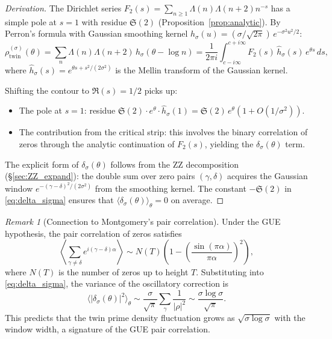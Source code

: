 \documentclass[11pt,a4paper]{article}
\theoremstyle{remark}
\newtheorem{remark}[theorem]{Remark}
\begin{document}
\begin{proof}[Derivation]
The Dirichlet series $F_2(s) = \sum_{n\ge 1}\Lambda(n)\Lambda(n+2)n^{-s}$ has a simple pole at $s=1$ with residue $\mathfrak{S}(2)$ (Proposition~\ref{prop:analytic}).
By Perron's formula with Gaussian smoothing kernel $h_\sigma(u) = (\sigma/\sqrt{2\pi})\,e^{-\sigma^2 u^2/2}$:
\begin{equation}\label{eq:perron_smooth}
\rho_{\mathrm{twin}}^{(\sigma)}(\theta) = \sum_n \Lambda(n)\Lambda(n+2)\,h_\sigma(\theta - \log n) = \frac{1}{2\pi i}\int_{c-i\infty}^{c+i\infty} F_2(s)\,\widehat{h}_\sigma(s)\,e^{\theta s}\,ds,
\end{equation}
where $\widehat{h}_\sigma(s) = e^{\theta s + s^2/(2\sigma^2)}$ is the Mellin transform of the Gaussian kernel.

Shifting the contour to $\Re(s) = 1/2$ picks up:
\begin{itemize}
\item The pole at $s=1$: residue $\mathfrak{S}(2)\cdot e^{\theta}\cdot\widehat{h}_\sigma(1) = \mathfrak{S}(2)\,e^{\theta}(1+O(1/\sigma^2))$.
\item The contribution from the critical strip: this involves the binary correlation of zeros through the analytic continuation of $F_2(s)$, yielding the $\delta_\sigma(\theta)$ term.
\end{itemize}

The explicit form of $\delta_\sigma(\theta)$ follows from the ZZ decomposition (\S\ref{sec:ZZ_expand}): the double sum over zero pairs $(\gamma,\delta)$ acquires the Gaussian window $e^{-(\gamma-\delta)^2/(2\sigma^2)}$ from the smoothing kernel.
The constant $-\mathfrak{S}(2)$ in \eqref{eq:delta_sigma} ensures that $\langle\delta_\sigma(\theta)\rangle_\theta = 0$ on average.
\end{proof}

\begin{remark}[Connection to Montgomery's pair correlation]
Under the GUE hypothesis, the pair correlation of zeros satisfies
\begin{equation}\label{eq:gue_pair}
\left\langle\sum_{\gamma\ne\delta}e^{i(\gamma-\delta)\alpha}\right\rangle \sim N(T)\left(1 - \left(\frac{\sin(\pi\alpha)}{\pi\alpha}\right)^2\right),
\end{equation}
where $N(T)$ is the number of zeros up to height $T$.
Substituting into \eqref{eq:delta_sigma}, the variance of the oscillatory correction is
\begin{equation}\label{eq:var_delta}
\langle|\delta_\sigma(\theta)|^2\rangle_\theta \sim \frac{\sigma}{\sqrt{\pi}}\sum_\gamma\frac{1}{|\rho|^2} \sim \frac{\sigma\log\sigma}{\sqrt{\pi}}.
\end{equation}
This predicts that the twin prime density fluctuation grows as $\sqrt{\sigma\log\sigma}$ with the window width, a signature of the GUE pair correlation.
\end{remark}
\end{document}
